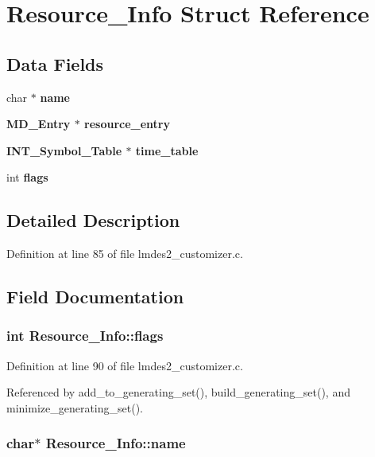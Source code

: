 \section{Resource\_\-Info Struct Reference}
\label{structResource__Info}
\subsection*{Data Fields}
\begin{CompactItemize}
\item 
char $\ast$ \bf{name}
\item 
\bf{MD\_\-Entry} $\ast$ \bf{resource\_\-entry}
\item 
\bf{INT\_\-Symbol\_\-Table} $\ast$ \bf{time\_\-table}
\item 
int \bf{flags}
\end{CompactItemize}


\subsection{Detailed Description}




Definition at line 85 of file lmdes2\_\-customizer.c.

\subsection{Field Documentation}
\subsubsection{\setlength{\rightskip}{0pt plus 5cm}int \bf{Resource\_\-Info::flags}}\label{structResource__Info_44136b3784d799962f70d46b95e00245}




Definition at line 90 of file lmdes2\_\-customizer.c.

Referenced by add\_\-to\_\-generating\_\-set(), build\_\-generating\_\-set(), and minimize\_\-generating\_\-set().
\subsubsection{\setlength{\rightskip}{0pt plus 5cm}char$\ast$ \bf{Resource\_\-Info::name}}\label{structResource__Info_9897dc471a7e5f4a91fb0bc2c614b12b}




